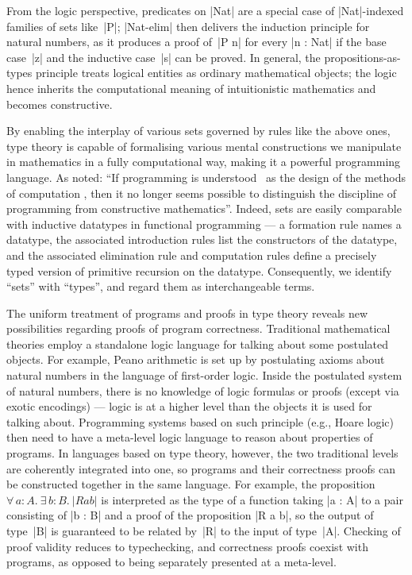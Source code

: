 \begin{center}
  
 \DP
\end{center}
From the logic perspective, predicates on |Nat| are a special case of |Nat|-indexed families of sets like~|P|; |Nat-elim| then delivers the induction principle for natural numbers, as it produces a proof of~|P n| for every |n : Nat| if the base case~|z| and the inductive case~|s| can be proved.
In general, the propositions-as-types principle treats logical entities as ordinary mathematical objects; the logic hence inherits the computational meaning of intuitionistic mathematics and becomes constructive.

By enabling the interplay of various sets governed by rules like the above ones, type theory is capable of formalising various mental constructions we manipulate in mathematics in a fully computational way, making it a powerful programming language.
As \citet{ML-constructive-math-programming} noted: ``If programming is understood \omission\ as the design of the methods of computation \omission, then it no longer seems possible to distinguish the discipline of programming from constructive mathematics''.
Indeed, sets are easily comparable with inductive datatypes in functional programming --- a formation rule names a datatype, the associated introduction rules list the constructors of the datatype, and the associated elimination rule and computation rules define a precisely typed version of primitive recursion on the datatype.
Consequently, we identify ``sets'' with ``types'', and regard them as interchangeable terms.

The uniform treatment of programs and proofs in type theory reveals new possibilities regarding proofs of program correctness.
Traditional mathematical theories employ a standalone logic language for talking about some postulated objects.
For example, Peano arithmetic is set up by postulating axioms about natural numbers in the language of first-order logic.
Inside the postulated system of natural numbers, there is no knowledge of logic formulas or proofs (except via exotic encodings) --- logic is at a higher level than the objects it is used for talking about.
Programming systems based on such principle (e.g., Hoare logic) then need to have a meta-level logic language to reason about properties of programs.
In  languages based on type theory, however, the two traditional levels are coherently integrated into one, so programs and their correctness proofs can be constructed together in the same language.
For example, the proposition $\forall\,a : A.~\exists\,b : B.~|R a b|$ is interpreted as the type of a function taking |a : A| to a pair consisting of |b : B| and a proof of the proposition |R a b|, so the output of type~|B| is guaranteed to be related by~|R| to the input of type~|A|.
Checking of proof validity reduces to typechecking, and correctness proofs coexist with programs, as opposed to being separately presented at a meta-level.

